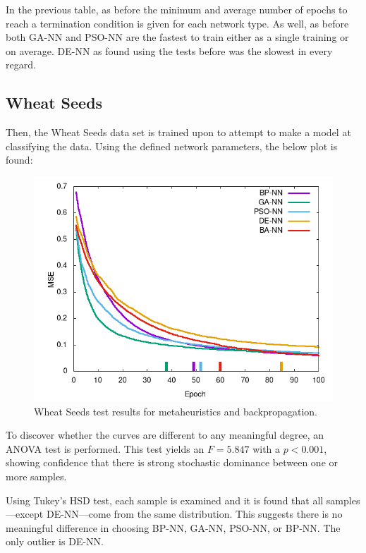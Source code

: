 \documentclass[a4paper,12pt]{article}
\begin{document}
In the previous table, as before the minimum and average number of epochs to reach a termination condition is given for each network type. As well, as before both GA-NN and PSO-NN are the fastest to train either as a single training or on average. DE-NN as found using the tests before was the slowest in every regard.

\pagebreak

\subsection{Wheat Seeds}

Then, the Wheat Seeds data set is trained upon to attempt to make a model at classifying the data. Using the defined network parameters, the below plot is found:

\begin{figure}[h!]
\centering
\includegraphics[scale=0.65]{images/wheat-plot.png}
\caption{Wheat Seeds test results for metaheuristics and backpropagation.}
\label{fig:wheat}
\end{figure}

To discover whether the curves are different to any meaningful degree, an ANOVA test is performed. This test yields an $F = 5.847$ with a $p < 0.001$, showing confidence that there is strong stochastic dominance between one or more samples.

Using Tukey's HSD test, each sample is examined and it is found that all samples---except DE-NN---come from the same distribution. This suggests there is no meaningful difference in choosing BP-NN, GA-NN, PSO-NN, or BP-NN. The only outlier is DE-NN.
\end{document}
